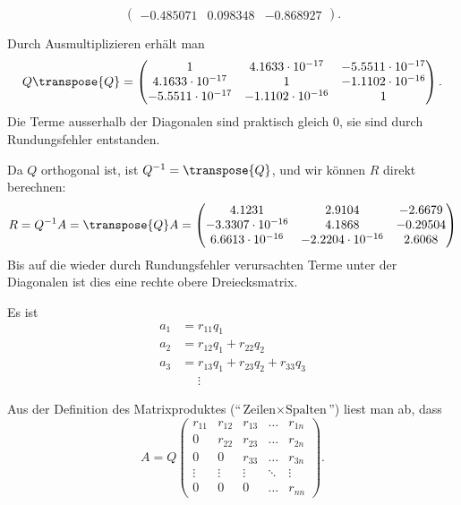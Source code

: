 \begin{loesung}
\begin{teilaufgaben}
\[\begin{pmatrix}
  -0.485071&  0.098348& -0.868927
\end{pmatrix}.
\]
\item
Durch Ausmultiplizieren erhält man
\[
Q\transpose{Q}
=
\begin{pmatrix}
   1                  &  4.1633\cdot10^{-17}&-5.5511\cdot10^{-17}\\
   4.1633\cdot10^{-17}&  1                  &-1.1102\cdot10^{-16}\\
  -5.5511\cdot10^{-17}& -1.1102\cdot10^{-16}&  1
\end{pmatrix}.
\]
Die Terme ausserhalb der Diagonalen sind praktisch gleich $0$, sie
sind durch Rundungsfehler entstanden.
\item
Da $Q$ orthogonal ist, ist $Q^{-1}=\transpose{Q}$, und wir können $R$ direkt
berechnen:
\[
R=Q^{-1}A=\transpose{Q}A=
\begin{pmatrix}
   4.1231             & 2.9104             &-2.6679    \\
  -3.3307\cdot10^{-16}& 4.1868             &-0.29504   \\
   6.6613\cdot10^{-16}&-2.2204\cdot10^{-16}& 2.6068
\end{pmatrix}
\]
Bis auf die wieder durch Rundungsfehler verursachten Terme unter der
Diagonalen ist dies eine rechte obere Dreiecksmatrix.
\item
Es ist
\begin{align*}
a_1 &= r_{11} q_1 \\
a_2 &= r_{12} q_1 + r_{22} q_2 \\
a_3 &= r_{13} q_1 + r_{23} q_2 + r _{33} q_3 \\
    &\phantom{=}\vdots
\end{align*}
\item
Aus der Definition des Matrixproduktes (``$\text{Zeilen}\times\text{Spalten}$'')
liest man ab, dass 
\[
A=Q\begin{pmatrix}
r_{11}&r_{12}&r_{13}&\dots &r_{1n}\\
     0&r_{22}&r_{23}&\dots &r_{2n}\\
     0&     0&r_{33}&\dots &r_{3n}\\
\vdots&\vdots&\vdots&\ddots&\vdots\\
     0&     0&     0&\dots &r_{nn}
\end{pmatrix}.
\]
\end{teilaufgaben}
\end{loesung}

